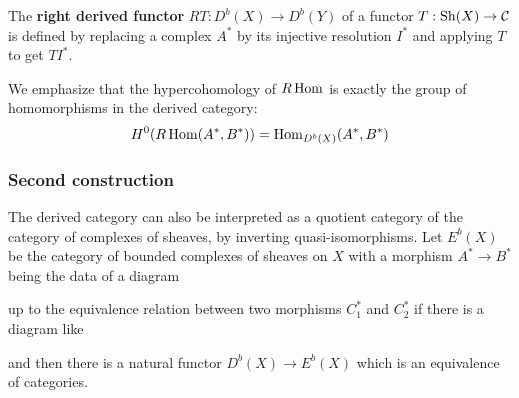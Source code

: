 \documentclass[12pt]{article}
\begin{document}
    \begin{definition}
        The \textbf{right derived functor} $RT: D^b(X) \to D^b(Y)$ of a functor
        $T:\operatorname{Sh}(X)\to {\mathcal{C}}$ is defined by replacing a complex $A^*$
        by its injective resolution $I^*$ and applying $T$ to get $TI^*$.
    \end{definition}

    \begin{remark}
        We emphasize that the hypercohomology of $R\operatorname{Hom}$ is exactly the group of
        homomorphisms in the derived category: \begin{align*}
            H^0(R\operatorname{Hom}(A^*,B^*)) = \operatorname{Hom}_{D^b(X)}(A^*,B^*)
        \end{align*}
    \end{remark}

    \subsubsection{Second construction}
    The derived category can also be interpreted as a quotient
    category of the category of complexes of sheaves, by inverting
    quasi-isomorphisms. Let $E^b(X)$ be the category of bounded
    complexes of sheaves on $X$ with a morphism $A^*\to B^*$ being the data of a diagram \begin{center}
    \end{center} up to the equivalence relation between two morphisms $C^*_1$ and $C^*_2$ if there is
    a diagram like \begin{center}
    \end{center}
    and then there is a natural functor $D^b(X) \to E^b(X)$ which is an equivalence of categories.
\end{document}
